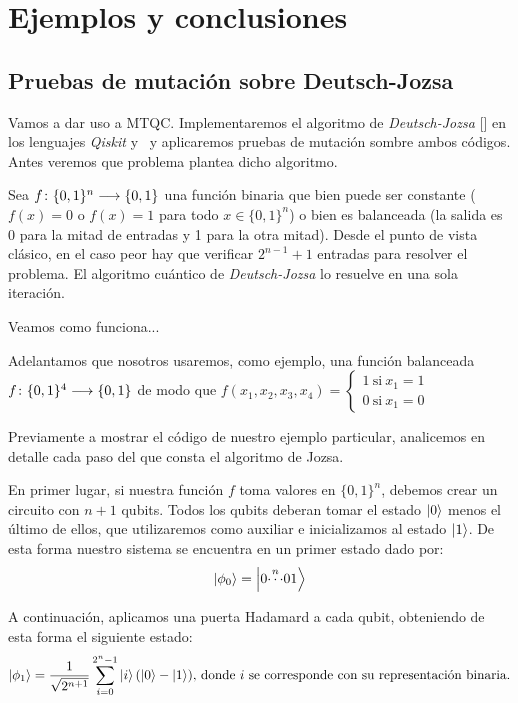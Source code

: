 \chapter{Ejemplos y conclusiones}

\section{Pruebas de mutación sobre Deutsch-Jozsa}

Vamos a dar uso a MTQC. Implementaremos el algoritmo de \textit{Deutsch-Jozsa} [\cite{deutsch1992rapid}] en los lenguajes \textit{Qiskit} y \qsh\ y aplicaremos pruebas de mutación sombre ambos códigos. Antes veremos que problema plantea dicho algoritmo.

Sea $f\colon \{0,1\}^n\longrightarrow \{0,1\}$ una función binaria que bien puede ser constante ($f(x) = 0$ o $f(x) = 1$ para todo $x\in\{0,1\}^n$) o bien es balanceada (la salida es 0 para la mitad de entradas y 1 para la otra mitad). Desde el punto de vista clásico, en el caso peor hay que verificar $2^{n-1}+1$ entradas para resolver el problema. El algoritmo cuántico de \textit{Deutsch-Jozsa} lo resuelve en una sola iteración.

Veamos como funciona... %

Adelantamos que nosotros usaremos, como ejemplo, una función balanceada $f\colon \{0,1\}^4\longrightarrow \{0,1\}$ de modo que $f(x_1,x_2,x_3,x_4)=\left\{\begin{matrix}1 \mathrm{\ si\ } x_1=1\\0 \mathrm{\ si\ } x_1=0\end{matrix}\right.$

Previamente a mostrar el código de nuestro ejemplo particular, analicemos en detalle cada paso del que consta el algoritmo de Jozsa.

En primer lugar, si nuestra función $f$ toma valores en $\{0,1\}^n$, debemos crear un circuito con $n + 1$ qubits. Todos los qubits deberan tomar el estado $\left|0\right\rangle$ menos el último de ellos, que utilizaremos como auxiliar e inicializamos al estado $\left|1\right\rangle$. De esta forma nuestro sistema se encuentra en un primer estado dado por:
\begin{equation}
\left|\phi_0\right\rangle = \left|0\overset{n}{\cdots}01\right\rangle
\end{equation}

A continuación, aplicamos una puerta Hadamard a cada qubit, obteniendo de esta forma el siguiente estado:
\begin{equation}
\left|\phi_1\right\rangle = \dfrac{1}{\sqrt{2^{n+1}}} \sum\limits_{i=0}^{2^n - 1} \left|i\right\rangle(\left|0\right\rangle-\left|1\right\rangle) \textrm{, donde $i$ se corresponde con su representación binaria.}
\end{equation}

